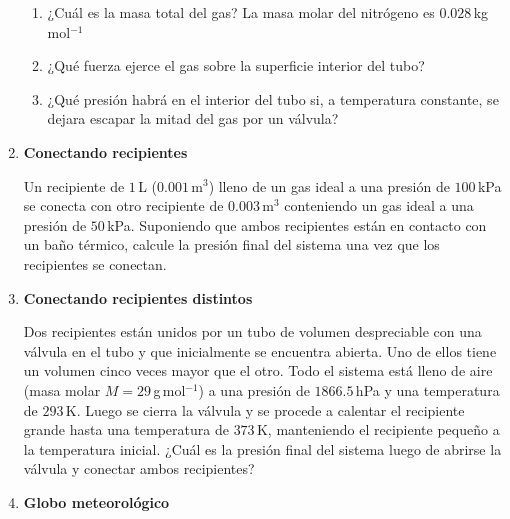 \documentclass[a4paper,12pt]{article}
\begin{document}
\begin{enumerate}
		\begin{enumerate}
			\item ¿Cuál es la masa total del gas? La masa molar del nitrógeno
				es $0.028$\,kg\,mol$^{-1}$
			\item ¿Qué fuerza ejerce el gas sobre la superficie interior del tubo?
			\item ¿Qué presión habrá en el interior del tubo si, a temperatura
				constante, se dejara escapar la mitad del gas por un válvula?
		\end{enumerate}
 
	\item {\bf{Conectando recipientes}}

		Un recipiente de $1$\,L ($0.001$\,m$^3$) lleno de un gas ideal a una
		presión de $100$\,kPa se conecta con otro recipiente de $0.003$\,m$^3$
		conteniendo un gas ideal a una presión de $50$\,kPa. Suponiendo que
		ambos recipientes están en contacto con un baño térmico, calcule la
		presión final del sistema una vez que los recipientes se conectan.
	
	\item {\bf{Conectando recipientes distintos}}
	
		Dos recipientes están unidos por un tubo de volumen despreciable con
		una válvula en el tubo y que inicialmente se encuentra abierta. Uno de
		ellos tiene un volumen cinco veces mayor que el otro. Todo el sistema
		está lleno de aire (masa molar $M=29$\,g\,mol$^{-1}$) a una presión de
		$1866.5$\,hPa y una temperatura de $293$\,K. Luego se cierra la válvula
		y se procede a calentar el recipiente grande hasta una temperatura de
		$373$\,K, manteniendo el recipiente pequeño a la temperatura inicial.
		¿Cuál es la presión final del sistema luego de abrirse la válvula y
		conectar ambos recipientes? 
	
	\item {\bf{Globo meteorológico}}
		

\end{enumerate}
\end{document}
